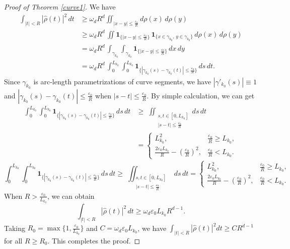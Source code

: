 \documentclass[12pt,a4paper,intlimits,sumlimits]{amsart}
\theoremstyle{plain}
\theoremstyle{definition}
\newcounter{rem}
\begin{document}
\begin{proof}[Proof of Theorem \ref{curve1}]
We have
\begin{align*}\int_{|t|<R} |\hat{\rho}(t)|^2\,dt &\ge \omega_d R^d\iint_{|x-y|\le \frac{\varepsilon_0}{R}} d\rho(x)\,d\rho(y)\\
&\geq  
\omega_d R^d\,\iint \mathbf{1}_{\{|x-y|\le \frac{\varepsilon_0}{R}\}}\,\mathbf{1}_{\{x\in\gamma_{k_0},\,y\in\gamma_{k_0}\}}\,d\rho(x)\,d\rho(y)
\\&= \omega_d R^d\,  \int_{\gamma_{k_0}}\int_{\gamma_{k_0}} \mathbf{1}_{\{|x-y|\le \frac{\varepsilon_0}{R}\}}\, dx\, dy\\&=\omega_d R^d\, \int_0^{L_{k_0}}\int_0^{L_{k_0}} \mathbf{1}_{\{|\gamma_{k_0}(s)-\gamma_{k_0}(t)|\le\frac{\varepsilon_0}{R}\}}\,ds\,dt.
\end{align*}
Since $\gamma_{k_0} $ is arc-length parametrizations of curve segments, 
  we have  $|\gamma'_{k_0}(s)|\equiv1$ and $ |\gamma_{k_0}(s)-\gamma_{k_0}(t)|\le \frac{\varepsilon_0}{R}$ when $|s-t|\le \frac{\varepsilon_0}{R}$. By simple calculation, we can get
\ifdefined\SMART
\begin{align*}\label{eq:5.1}
\int_0^{L_{k_0}}\int_0^{L_{k_0}} \mathbf{1}_{\{|\gamma_{k_0}(s)-\gamma_{k_0}(t)|\le\frac{\varepsilon_0}{R}\}}\,ds\,dt &\ge\; \iint_{\substack{s,t\in[0,L_{k_0}]\\ |s-t|\le\frac{\varepsilon_0}{R}}} ds\,dt\\
&= \begin{cases}
L_{k_0}^2, & \frac{\varepsilon_0}{R}\geq L_{k_0},\\[6pt]
\frac{2\varepsilon_0L_{k_0}}{R}-(\frac{\varepsilon_0}{R})^2, & \frac{\varepsilon_0}{R}< L_{k_0}.
\end{cases}
\end{align*}
\else
\begin{equation*}\label{eq:5.1}
\int_0^{L_{k_0}}\int_0^{L_{k_0}} \mathbf{1}_{\{|\gamma_{k_0}(s)-\gamma_{k_0}(t)|\le\frac{\varepsilon_0}{R}\}}\,ds\,dt \ge\; \iint_{\substack{s,t\in[0,L_{k_0}]\\ |s-t|\le\frac{\varepsilon_0}{R}}} ds\,dt= \begin{cases}
L_{k_0}^2, & \frac{\varepsilon_0}{R}\geq L_{k_0},\\[6pt]
\frac{2\varepsilon_0L_{k_0}}{R}-(\frac{\varepsilon_0}{R})^2, & \frac{\varepsilon_0}{R}< L_{k_0}.
\end{cases} \end{equation*}
\fi
When $R>\frac{\varepsilon_0}{L_{k_0}}$, we can obtain  $$
\int_{|t|< R}|\widehat \rho(t)|^2\,dt
   \geq \omega_d \varepsilon_0 L_{k_0} R^{d-1}.$$
Taking $R_0=\max\{1, \frac{\varepsilon_0}{L_{k_0}}\}$ and $C=\omega_d \varepsilon_0 L_{k_0}$, we have $  \int_{|t|<R}|\widehat{\rho}(t)|^2 d t\geq CR^{d-1} $   for all $R\geq R_0 $. This completes the proof.
  
\end{proof}
 
\end{document}
